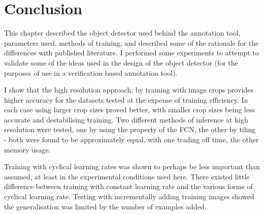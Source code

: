 \section {Conclusion}

This chapter described the object detector used behind the annotation tool, parameters used, methods of training, and described some of the rationale for the differences with published literature. I performed some experiments to attempt to validate some of the ideas used in the design of the object detector (for the purposes of use in a verification based annotation tool). 

I show that the high resolution approach; by training with image crops provides higher accuracy for the datasets tested at the expense of training efficiency. In each case using larger crop sizes proved better, with smaller crop sizes being less accurate and destabilising training. Two different methods of inference at high resolution were tested, one by using the property of the \gls{FCN}, the other by tiling - both were found to be approximately equal, with one trading off time, the other memory usage.

Training with cyclical learning rates was shown to perhaps be less important than assumed, at least in the experimental conditions used here. There existed little difference between training with constant learning rate and the various forms of cyclical learning rate. Testing with incrementally adding training images showed the generalisation was limited by the number of examples added.




